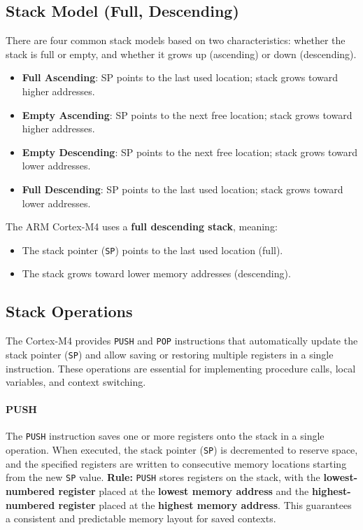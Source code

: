 \subsection{Stack Model (Full, Descending)}
There are four common stack models based on two characteristics: whether the stack is full or empty, and whether it grows up (ascending) or down (descending). 
\begin{itemize}[nosep]
    \item \textbf{Full Ascending}: SP points to the last used location; stack grows toward higher addresses.
    \item \textbf{Empty Ascending}: SP points to the next free location; stack grows toward higher addresses.
    \item \textbf{Empty Descending}: SP points to the next free location; stack grows toward lower addresses.
    \item \textbf{Full Descending}: SP points to the last used location; stack grows toward lower addresses.
\end{itemize}
The ARM Cortex-M4 uses a \textbf{full descending stack}, meaning:
\begin{itemize}[nosep]
    \item The stack pointer (\texttt{SP}) points to the last used location (full).
    \item The stack grows toward lower memory addresses (descending).
\end{itemize}
\subsection{Stack Operations}

The Cortex-M4 provides \texttt{PUSH} and \texttt{POP} instructions that automatically update the stack pointer (\texttt{SP}) and allow saving or restoring multiple registers in a single instruction.  
These operations are essential for implementing procedure calls, local variables, and context switching.
\paragraph{PUSH}

The \texttt{PUSH} instruction saves one or more registers onto the stack in a single operation.
When executed, the stack pointer (\texttt{SP}) is decremented to reserve space, and the specified registers are written to consecutive memory locations starting from the new \texttt{SP} value.
\textbf{Rule:} \texttt{PUSH} stores registers on the stack, with the \textbf{lowest-numbered register} placed at the \textbf{lowest memory address} and the \textbf{highest-numbered register} placed at the \textbf{highest memory address}.
This guarantees a consistent and predictable memory layout for saved contexts.

